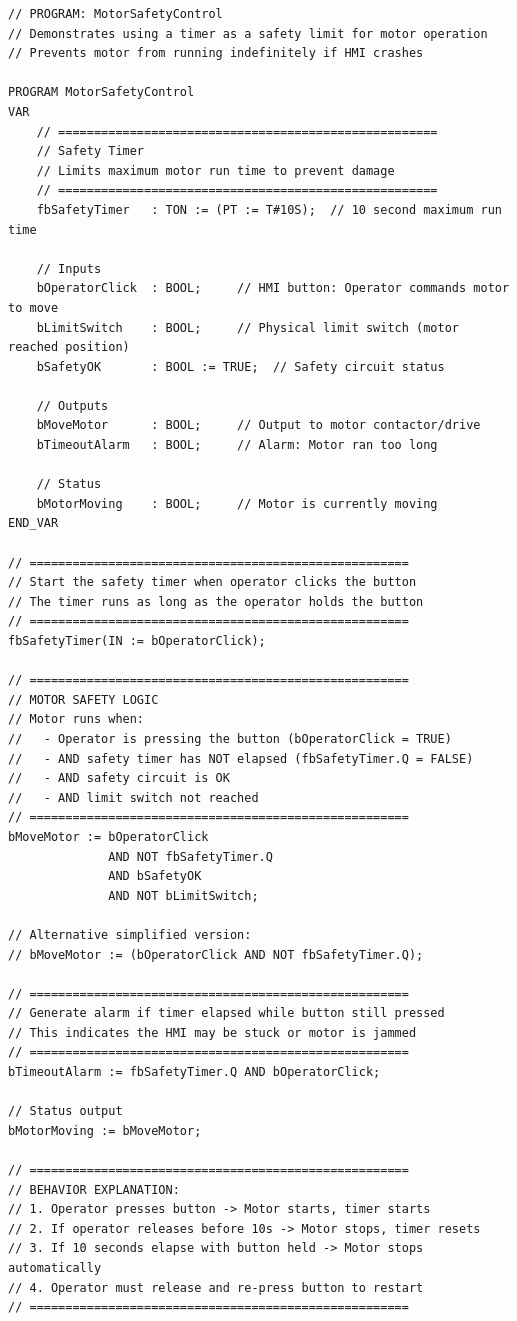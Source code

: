 \documentclass[11pt,a4paper]{article}
\begin{document}
\begin{lstlisting}
// PROGRAM: MotorSafetyControl
// Demonstrates using a timer as a safety limit for motor operation
// Prevents motor from running indefinitely if HMI crashes

PROGRAM MotorSafetyControl
VAR
    // =====================================================
    // Safety Timer
    // Limits maximum motor run time to prevent damage
    // =====================================================
    fbSafetyTimer   : TON := (PT := T#10S);  // 10 second maximum run time
    
    // Inputs
    bOperatorClick  : BOOL;     // HMI button: Operator commands motor to move
    bLimitSwitch    : BOOL;     // Physical limit switch (motor reached position)
    bSafetyOK       : BOOL := TRUE;  // Safety circuit status
    
    // Outputs
    bMoveMotor      : BOOL;     // Output to motor contactor/drive
    bTimeoutAlarm   : BOOL;     // Alarm: Motor ran too long
    
    // Status
    bMotorMoving    : BOOL;     // Motor is currently moving
END_VAR

// =====================================================
// Start the safety timer when operator clicks the button
// The timer runs as long as the operator holds the button
// =====================================================
fbSafetyTimer(IN := bOperatorClick);

// =====================================================
// MOTOR SAFETY LOGIC
// Motor runs when:
//   - Operator is pressing the button (bOperatorClick = TRUE)
//   - AND safety timer has NOT elapsed (fbSafetyTimer.Q = FALSE)
//   - AND safety circuit is OK
//   - AND limit switch not reached
// =====================================================
bMoveMotor := bOperatorClick 
              AND NOT fbSafetyTimer.Q 
              AND bSafetyOK 
              AND NOT bLimitSwitch;

// Alternative simplified version:
// bMoveMotor := (bOperatorClick AND NOT fbSafetyTimer.Q);

// =====================================================
// Generate alarm if timer elapsed while button still pressed
// This indicates the HMI may be stuck or motor is jammed
// =====================================================
bTimeoutAlarm := fbSafetyTimer.Q AND bOperatorClick;

// Status output
bMotorMoving := bMoveMotor;

// =====================================================
// BEHAVIOR EXPLANATION:
// 1. Operator presses button -> Motor starts, timer starts
// 2. If operator releases before 10s -> Motor stops, timer resets
// 3. If 10 seconds elapse with button held -> Motor stops automatically
// 4. Operator must release and re-press button to restart
// =====================================================
\end{lstlisting}
\end{document}
